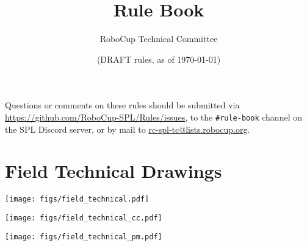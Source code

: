 \documentclass[12pt]{article}
\title{\leaguename Rule Book}
\author{RoboCup Technical Committee}
\date{(DRAFT \RCYear rules, as of \today)}
\begin{document}
\maketitle

\begin{center}
  Questions or comments on these rules should be submitted via \url{https://github.com/RoboCup-SPL/Rules/issues}, to the \texttt{\#rule-book} channel on the SPL Discord server, or by mail to \url{rc-spl-tc@lists.robocup.org}.
\end{center}

\newpage

\tableofcontents
\setcounter{tocdepth}{3}

\thispagestyle{fancy}

\clearpage

\cfoot{\thepage}
\setcounter{page}{1}

\newpage


\newpage


\newpage


\newpage


\newpage


\newpage


\appendix


\newpage


\newpage

\section{Field Technical Drawings}
\label{apx:technical-drawing}
\centerline{\texttt{[image: figs/field\_technical.pdf]}}

\clearpage
\centerline{\texttt{[image: figs/field\_technical\_cc.pdf]}}

\centerline{\texttt{[image: figs/field\_technical\_pm.pdf]}}
\end{document}
